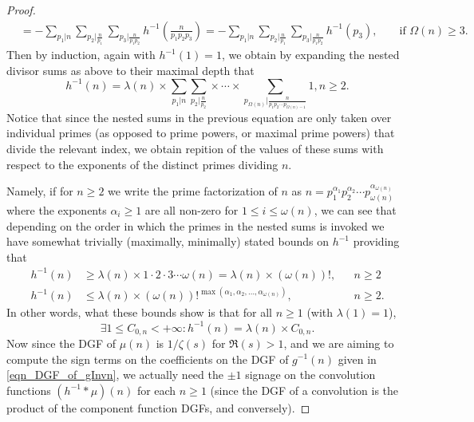 \documentclass[11pt,reqno,a4letter]{article}
\numberwithin{figure}{section}
\numberwithin{table}{section}
\theoremstyle{plain}
\numberwithin{theorem}{section}
\theoremstyle{definition}
\begin{document}
\begin{proof}
\begin{align*}
     & = -\sum_{p_1|n} \sum_{p_2|\frac{n}{p_1}} \sum_{p_3|\frac{n}{p_1p_2}} h^{-1}\left(\frac{n}{p_1p_2p_3}\right) = 
     -\sum_{p_1|n} \sum_{p_2|\frac{n}{p_1}} \sum_{p_3|\frac{n}{p_1p_2}} h^{-1}(p_3), && \text{\ if\ } \Omega(n) \geq 3. 
\end{align*} 
Then by induction, again with $h^{-1}(1) = 1$, we obtain by expanding the 
nested divisor sums as above to their maximal depth that 
\[
h^{-1}(n) = \lambda(n) \times \sum_{p_1|n} \sum_{p_2|\frac{n}{p_2}} \times \cdots \times 
     \sum_{p_{\Omega(n)}|\frac{n}{p_1p_2 \cdots p_{\Omega(n)-1}}} 1, n \geq 2. 
\]
Notice that since the nested sums in the previous equation are only taken over individual primes 
(as opposed to prime powers, or maximal prime powers) that divide the relevant index, 
we obtain repition of the values of these sums with respect to the exponents of the distinct primes dividing $n$. 

Namely, if for $n \geq 2$ we write the prime factorization of $n$ as 
$n = p_1^{\alpha_1} p_2^{\alpha_2} \cdots p_{\omega(n)}^{\alpha_{\omega(n)}}$ where the exponents $\alpha_i \geq 1$ are all 
non-zero for $1 \leq i \leq \omega(n)$, we can see that 
depending on the order in which the primes in the nested sums is invoked we have somewhat trivially 
(maximally, minimally) stated bounds on $h^{-1}$ providing that 
\begin{align*} 
h^{-1}(n) & \geq \lambda(n) \times 1 \cdot 2 \cdot 3 \cdots \omega(n) = \lambda(n) \times (\omega(n))!, && n \geq 2 \\ 
h^{-1}(n) & \leq \lambda(n) \times (\omega(n))!^{\max(\alpha_1, \alpha_2, \ldots, \alpha_{\omega(n)})}, && n \geq 2. 
\end{align*} 
In other words, what these bounds show is that for all $n \geq 1$ (with $\lambda(1) = 1$), 
\begin{equation} 
\label{eqn_proof_tag_SignedTimesPosConstantFormOf_hInvn_v2}
\exists 1 \leq C_{0,n} < +\infty: h^{-1}(n) = \lambda(n) \times C_{0,n}.
\end{equation}
Now since the DGF of $\mu(n)$ is $1 / \zeta(s)$ for $\Re(s) > 1$, and we are aiming to compute the sign terms on 
the coefficients on the DGF of $g^{-1}(n)$ given in \eqref{eqn_DGF_of_gInvn}, 
we actually need the $\pm 1$ signage on the convolution functions $(h^{-1} \ast \mu)(n)$ for each $n \geq 1$ 
(since the DGF of a convolution is the product of the component function DGFs, and conversely). 


\end{proof}
\end{document}
